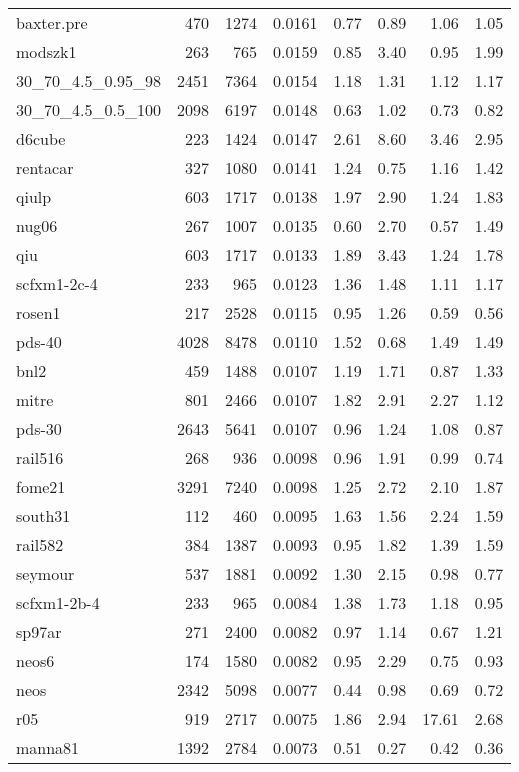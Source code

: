 \documentclass[10pt]{article}
\begin{document}
\begin{longtable}{|l|r|r|r|r|r|r|r|}
baxter.pre	&	470	&	1274	&	0.0161	&	0.77	&	0.89	&	1.06	&	1.05	\\
modszk1	&	263	&	765	&	0.0159	&	0.85	&	3.40	&	0.95	&	1.99	\\
30\_70\_4.5\_0.95\_98	&	2451	&	7364	&	0.0154	&	1.18	&	1.31	&	1.12	&	1.17	\\
30\_70\_4.5\_0.5\_100	&	2098	&	6197	&	0.0148	&	0.63	&	1.02	&	0.73	&	0.82	\\
d6cube	&	223	&	1424	&	0.0147	&	2.61	&	8.60	&	3.46	&	2.95	\\
rentacar	&	327	&	1080	&	0.0141	&	1.24	&	0.75	&	1.16	&	1.42	\\
qiulp	&	603	&	1717	&	0.0138	&	1.97	&	2.90	&	1.24	&	1.83	\\
nug06	&	267	&	1007	&	0.0135	&	0.60	&	2.70	&	0.57	&	1.49	\\
qiu	&	603	&	1717	&	0.0133	&	1.89	&	3.43	&	1.24	&	1.78	\\
scfxm1-2c-4	&	233	&	965	&	0.0123	&	1.36	&	1.48	&	1.11	&	1.17	\\
rosen1	&	217	&	2528	&	0.0115	&	0.95	&	1.26	&	0.59	&	0.56	\\
pds-40	&	4028	&	8478	&	0.0110	&	1.52	&	0.68	&	1.49	&	1.49	\\
bnl2	&	459	&	1488	&	0.0107	&	1.19	&	1.71	&	0.87	&	1.33	\\
mitre	&	801	&	2466	&	0.0107	&	1.82	&	2.91	&	2.27	&	1.12	\\
pds-30	&	2643	&	5641	&	0.0107	&	0.96	&	1.24	&	1.08	&	0.87	\\
rail516	&	268	&	936	&	0.0098	&	0.96	&	1.91	&	0.99	&	0.74	\\
fome21	&	3291	&	7240	&	0.0098	&	1.25	&	2.72	&	2.10	&	1.87	\\
south31	&	112	&	460	&	0.0095	&	1.63	&	1.56	&	2.24	&	1.59	\\
rail582	&	384	&	1387	&	0.0093	&	0.95	&	1.82	&	1.39	&	1.59	\\
seymour	&	537	&	1881	&	0.0092	&	1.30	&	2.15	&	0.98	&	0.77	\\
scfxm1-2b-4	&	233	&	965	&	0.0084	&	1.38	&	1.73	&	1.18	&	0.95	\\
sp97ar	&	271	&	2400	&	0.0082	&	0.97	&	1.14	&	0.67	&	1.21	\\
neos6	&	174	&	1580	&	0.0082	&	0.95	&	2.29	&	0.75	&	0.93	\\
neos	&	2342	&	5098	&	0.0077	&	0.44	&	0.98	&	0.69	&	0.72	\\
r05	&	919	&	2717	&	0.0075	&	1.86	&	2.94	&	17.61	&	2.68	\\
manna81	&	1392	&	2784	&	0.0073	&	0.51	&	0.27	&	0.42	&	0.36	\\

\end{longtable}
\end{document}
